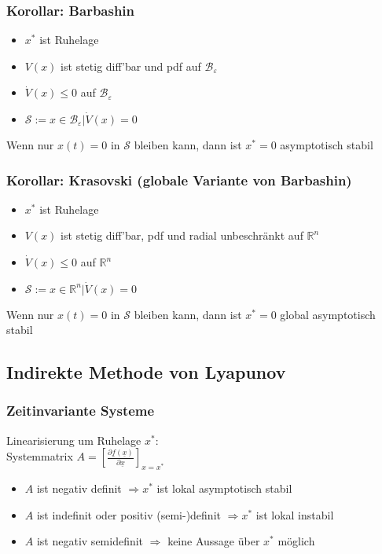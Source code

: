 \documentclass[6pt,a4paper,fleqn]{scrartcl}
\begin{document}
\begin{multicols*}{4}
\subsubsection*{Korollar: Barbashin}
\begin{itemize}
  \item $x^*$ ist Ruhelage
  \item $V(x)$ ist stetig diff'bar und pdf auf $\mathcal{B}_\varepsilon$
  \item $\dot{V}(x) \leq 0$ auf $\mathcal{B}_\varepsilon$
  \item $\mathcal{S} := {x \in \mathcal{B}_\varepsilon | \dot{V}(x) = 0 }$
\end{itemize}
Wenn nur $x(t)=0$ in $\mathcal{S}$ bleiben kann, dann ist $x^* = 0$ asymptotisch stabil

\subsubsection*{Korollar: Krasovski (globale Variante von Barbashin)}
\begin{itemize}
  \item $x^*$ ist Ruhelage
  \item $V(x)$ ist stetig diff'bar, pdf und radial unbeschränkt auf $\mathbb{R}^n$ 
  \item $\dot{V}(x) \leq 0$ auf $\mathbb{R}^n$
  \item $\mathcal{S} := {x \in \mathbb{R}^n | \dot{V}(x) = 0 }$
\end{itemize}
Wenn nur $x(t)=0$ in $\mathcal{S}$ bleiben kann, dann ist $x^* = 0$ global asymptotisch stabil


\subsection{Indirekte Methode von Lyapunov}

\subsubsection*{Zeitinvariante Systeme}
Linearisierung um Ruhelage $x^*$:\\
Systemmatrix $A = \left[ \frac{\partial \underline{f}(\underline{x})}{\partial \underline{x}} \right]_{x=x^*}$
\begin{itemize}
  \item $A$ ist negativ definit $\Rightarrow x^*$ ist lokal asymptotisch stabil
  \item $A$ ist indefinit oder positiv (semi-)definit $\Rightarrow x^*$ ist lokal instabil
  \item $A$ ist negativ semidefinit $\Rightarrow$ keine Aussage über $x^*$ möglich
\end{itemize}


\end{multicols*}
\end{document}
